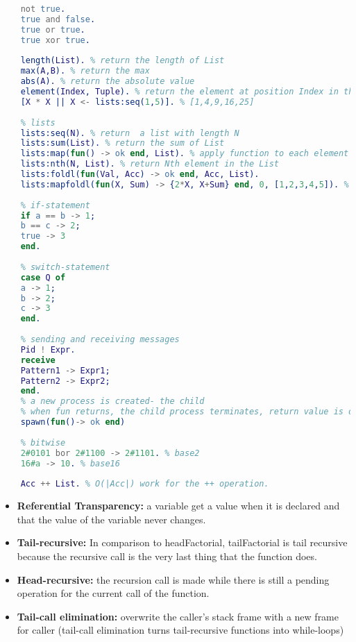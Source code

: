 \documentclass[../main.tex]{subfiles}
\begin{document}
\begin{lstlisting}[language=erlang]
    % boolean expressions
    not true.
    true and false.
    true or true.
    true xor true.
    
    length(List). % return the length of List
    max(A,B). % return the max
    abs(A). % return the absolute value
    element(Index, Tuple). % return the element at position Index in the Tuple
    [X * X || X <- lists:seq(1,5)]. % [1,4,9,16,25]
    
    % lists
    lists:seq(N). % return  a list with length N
    lists:sum(List). % return the sum of List
    lists:map(fun() -> ok end, List). % apply function to each element in the List
    lists:nth(N, List). % return Nth element in the List
    lists:foldl(fun(Val, Acc) -> ok end, Acc, List).
    lists:mapfoldl(fun(X, Sum) -> {2*X, X+Sum} end, 0, [1,2,3,4,5]). % {[2,4,6,8,10],15}
    
    % if-statement
    if a == b -> 1;
    b == c -> 2;
    true -> 3
    end.
    
    % switch-statement
    case Q of
    a -> 1;
    b -> 2;
    c -> 3
    end.
    
    % sending and receiving messages
    Pid ! Expr.
    receive
    Pattern1 -> Expr1;
    Pattern2 -> Expr2;
    end.
    % a new process is created- the child
    % when fun returns, the child process terminates, return value is discarded.
    spawn(fun()-> ok end)
    
    % bitwise
    2#0101 bor 2#1100 -> 2#1101. % base2
    16#a -> 10. % base16
    
    Acc ++ List. % O(|Acc|) work for the ++ operation.
\end{lstlisting}


\begin{itemize}
	\item \textbf{Referential Transparency:} a variable get a value when it is declared and that the value of the variable never changes.
	\item \textbf{Tail-recursive:} In comparison to headFactorial, tailFactorial is tail recursive because the recursive call is the very last thing that the function does.
	\item \textbf{Head-recursive:} the recursion call is made while there is still a pending operation for the current call of the function.
	\item \textbf{Tail-call elimination:} overwrite the caller’s stack frame with a new frame for caller (tail-call elimination turns tail-recursive functions into while-loops)
\end{itemize}
\end{document}
